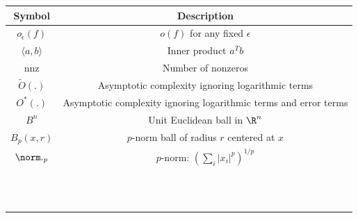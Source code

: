 \begin{flushleft}
\par\end{flushleft}

\begin{center}
\begin{tabular}{|c|c|}
\hline 
Symbol & Description\tabularnewline
\hline 
\hline 
$o_{\epsilon}(f)$ & $o(f)$ for any fixed $\epsilon$\tabularnewline
\hline 
$\langle a,b\rangle$ & Inner product $a^{T}b$\tabularnewline
\hline 
nnz & Number of nonzeros\tabularnewline
\hline 
$\tilde{O}(.)$ & Asymptotic complexity ignoring logarithmic terms\tabularnewline
\hline 
$O^{*}(.)$ & Asymptotic complexity ignoring logarithmic terms and error terms\tabularnewline
\hline 
$B^{n}$ & Unit Euclidean ball in $\R^{n}$\tabularnewline
\hline 
$B_{p}(x,r)$ & $p$-norm ball of radius $r$ centered at $x$\tabularnewline
\hline 
$\norm ._{p}$ & $p$-norm: $\left(\sum_{i}\left|x_{i}\right|^{p}\right)^{1/p}$ \tabularnewline
\hline 
 & \tabularnewline
\hline 
 & \tabularnewline
\hline 
 & \tabularnewline
\hline 
 & \tabularnewline
\hline 
 & \tabularnewline
\hline 
 & \tabularnewline
\hline 
 & \tabularnewline
\hline 
 & \tabularnewline
\hline 
 & \tabularnewline
\hline 
 & \tabularnewline
\hline 
 & \tabularnewline
\hline 
 & \tabularnewline
\hline 
\end{tabular}
\par\end{center}
